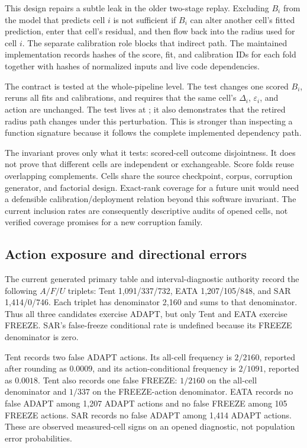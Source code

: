 This design repairs a subtle leak in the older two-stage replay.  Excluding $B_i$ from the model
that predicts cell $i$ is not sufficient if $B_i$ can alter another cell's fitted prediction,
enter that cell's residual, and then flow back into the radius used for cell $i$.  The separate
calibration role blocks that indirect path.  The maintained implementation records hashes of the
score, fit, and calibration IDs for each fold together with hashes of normalized inputs and live
code dependencies.

The contract is tested at the whole-pipeline level.  The test changes one scored $B_i$, reruns all
fits and calibrations, and requires that the same cell's $\widehat\Delta_i$,
$\varepsilon_i$, and action are unchanged.  The test lives at
; it also demonstrates that the retired radius path
changes under this perturbation.  This is stronger than inspecting a function signature because
it follows the complete implemented dependency path.

The invariant proves only what it tests: scored-cell outcome disjointness.  It does not prove that
different cells are independent or exchangeable.  Score folds reuse overlapping complements.
Cells share the source checkpoint, corpus, corruption generator, and factorial design.  Exact-rank
coverage for a future unit would need a defensible calibration/deployment relation beyond this
software invariant.  The current inclusion rates are consequently descriptive audits of opened
cells, not verified coverage promises for a new corruption family.

\subsection{Action exposure and directional errors}
\label{fr:sec-cifar-action-ledger}

The current generated primary table and interval-diagnostic authority record the following
$A/F/U$ triplets: Tent 1,091/337/732, EATA 1,207/105/848, and SAR 1,414/0/746.  Each triplet has
denominator 2,160 and sums to that denominator.  Thus all three candidates exercise ADAPT, but only
Tent and EATA exercise FREEZE.  SAR's false-freeze conditional rate is undefined because its
FREEZE denominator is zero.

Tent records two false ADAPT actions.  Its all-cell frequency is $2/2160$, reported after rounding
as $0.0009$, and its action-conditional frequency is $2/1091$, reported as $0.0018$.  Tent also
records one false FREEZE: $1/2160$ on the all-cell denominator and $1/337$ on the FREEZE-action
denominator.  EATA records no false ADAPT among 1,207 ADAPT actions and no false FREEZE among 105
FREEZE actions.  SAR records no false ADAPT among 1,414 ADAPT actions.  These are observed
measured-cell signs on an opened diagnostic, not population error probabilities.

